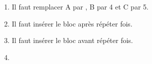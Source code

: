 \begin{enumerate}
	\begin{enumerate}
		\item %
Il faut remplacer A par , B par 4 et C par 5.
		\item %
Il faut insérer le bloc après répéter  fois.
		\item %
Il faut insérer le bloc avant répéter  fois.
		\item %
		


\end{enumerate}
\end{enumerate}

